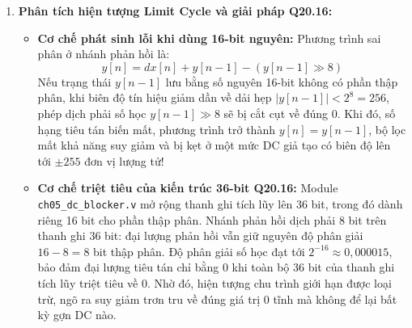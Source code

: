 \begin{enumerate}[label=(\alph*)]
    \item \textbf{Phân tích hiện tượng Limit Cycle và giải pháp Q20.16:}
    \begin{itemize}[leftmargin=1.5em, itemsep=2pt]
        \item \textbf{Cơ chế phát sinh lỗi khi dùng 16-bit nguyên:} Phương trình sai phân ở nhánh phản hồi là:
        \begin{equation}
        y[n] = dx[n] + y[n-1] - (y[n-1] \gg 8)
        \end{equation}
        Nếu trạng thái $y[n-1]$ lưu bằng số nguyên 16-bit không có phần thập phân, khi biên độ tín hiệu giảm dần về dải hẹp $|y[n-1]| < 2^8 = 256$, phép dịch phải số học $y[n-1] \gg 8$ sẽ bị cắt cụt về đúng $0$.
        Khi đó, số hạng tiêu tán biến mất, phương trình trở thành $y[n] = y[n-1]$, bộ lọc mất khả năng suy giảm và bị kẹt ở một mức DC giả tạo có biên độ lên tới $\pm 255$ đơn vị lượng tử!
        \item \textbf{Cơ chế triệt tiêu của kiến trúc 36-bit Q20.16:} Module \texttt{ch05\_dc\_blocker.v} mở rộng thanh ghi tích lũy lên 36 bit, trong đó dành riêng 16 bit cho phần thập phân.
        Nhánh phản hồi dịch phải 8 bit trên thanh ghi 36 bit: đại lượng phản hồi vẫn giữ nguyên độ phân giải $16 - 8 = 8$ bit thập phân. Độ phân giải số học đạt tới $2^{-16} \approx 0{,}000015$, bảo đảm đại lượng tiêu tán chỉ bằng 0 khi toàn bộ 36 bit của thanh ghi tích lũy triệt tiêu về 0.
        Nhờ đó, hiện tượng chu trình giới hạn được loại trừ, ngõ ra suy giảm trơn tru về đúng giá trị 0 tĩnh mà không để lại bất kỳ gợn DC nào.
    \end{itemize}
\end{enumerate}





